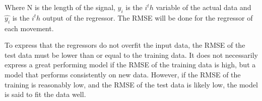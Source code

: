 Where N is the length of the signal, $y_i$ is the $i^th$ variable of the actual data and $\hat{y_i}$ is the $i^th$ output of the regressor. The RMSE will be done for the regressor of each movement.

To express that the regressors do not overfit the input data, the RMSE of the test data must be lower than or equal to the training data. It does not necessarily express a great performing model if the RMSE of the training data is high, but a model that performs consistently on new data. However, if the RMSE of the training is reasonably low, and the RMSE of the test data is likely low, the model is said to fit the data well. 


